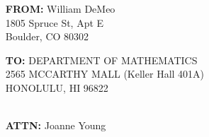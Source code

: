 \documentclass{article}
\begin{document}
\newcommand{\FROM}{William DeMeo}
\newcommand{\FADDRESSA}{1805 Spruce St, Apt E}
\newcommand{\FADDRESSB}{Boulder, CO 80302}
\newcommand{\FADDRESSC}{}

\newcommand{\TO}{DEPARTMENT OF MATHEMATICS}
\newcommand{\TADDRESSA}{2565 MCCARTHY MALL (Keller Hall 401A)}
\newcommand{\TADDRESSB}{HONOLULU, HI 96822}
\newcommand{\TADDRESSC}{}

\newcommand{\ATTN}{Joanne Young}

\thispagestyle{empty}

\vskip1cm

\begin{itemize}
\item[{\bf FROM:}]
  {\large \FROM}\\[5pt]%
  {\large \FADDRESSA}\\[5pt]%
  {\large \FADDRESSB}\\[5pt]%
  {\large \FADDRESSC}

\vskip1cm


\item[{\large {\bf TO:}}]
  {\Large \TO}\\[10pt]
  {\Large \TADDRESSA}\\[10pt]
  {\Large \TADDRESSB}\\[10pt]
  {\Large \TADDRESSC}\\[10pt]

\item[{\bf ATTN: }] {\Large \ATTN}
  
\end{itemize}
\end{document}
